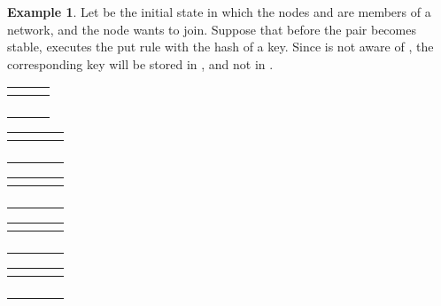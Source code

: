 \documentclass{amsart}
\theoremstyle{definition}
\newtheorem{example}{Example}[section]
\begin{document}
\begin{example} \label{primer_rr}
Let  be the initial state in which the nodes  and 
are members of a network, and
the node  wants to join. Suppose that before the pair
 becomes stable,  executes the put
rule with the hash  of a key. Since  is not aware of
, the corresponding key will be stored in , and not in
.
\begin{center}
\begin{tabular}{|c|c|c|}
\hline
\multicolumn{3}{|c|}{\boldmath{}} \\
\hline
 &  & \\
\hline
 &  &  \\
\hline
 &  &  \\
\hline
 &  &  \\
\hline
\end{tabular}

\begin{tabular}{|c|c|c|c|}
\hline
\multicolumn{4}{|c|}{\boldmath{}} \\
\hline
 &  & \boldmath{} & \\
\hline
 &  & \boldmath{} &  \\
\hline
 &  & \boldmath{} &  \\
\hline
 &  & \boldmath{} &  \\
\hline
\end{tabular}
\vspace{1mm}

\begin{tabular}{|c|c|c|c|}
\hline
\multicolumn{4}{|c|}{\boldmath{}} \\
\hline
 &  &  & \\
\hline
 &  &  & \boldmath{} \\
\hline
 &  &  &  \\
\hline
 &  &  &  \\
\hline
\end{tabular}

\begin{tabular}{|c|c|c|c|}
\hline
\multicolumn{4}{|c|}{\boldmath{}} \\
\hline
 &  &  & \\
\hline
 &  &  &  \\
\hline
 &  &  &  \\
\hline
 &  &  & \boldmath{} \\
\hline
\end{tabular}
\vspace{1mm}

\begin{tabular}{|c|c|c|c|}
\hline
\multicolumn{4}{|c|}{\boldmath{}} \\
\hline
 &  &  & \\
\hline
 &  &  &  \\
\hline
 & \boldmath{} &  &  \\
\hline
 &  &  &  \\
\hline
\end{tabular}


\end{center}
\end{example}
\end{document}
